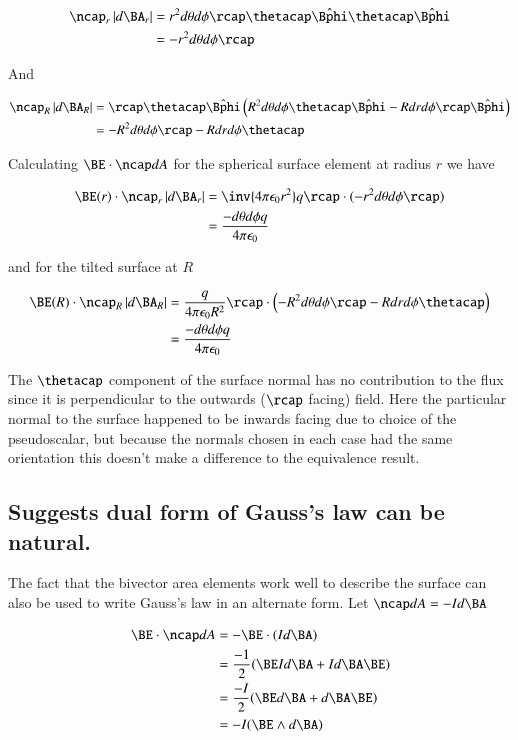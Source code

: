 \documentclass{article}
\newcommand{\phicap}[0]{\hat{\Bphi}}
\begin{document}
\begin{align*}
\ncap_r \Abs{d\BA_r}
&= r^2 d\theta d\phi \rcap \thetacap \phicap \thetacap\phicap \\
&= -r^2 d\theta d\phi \rcap \\
\end{align*}

And

\begin{align*}
\ncap_R \Abs{d\BA_R}
&= \rcap \thetacap \phicap \left( R^2 d\theta d\phi \thetacap \phicap - R dr d\phi \rcap \phicap \right) \\
&= - R^2 d\theta d\phi \rcap - R dr d\phi \thetacap
\end{align*}

Calculating $\BE \cdot \ncap dA$ for the spherical surface element at radius $r$ we have

\begin{align*}
\BE(r) \cdot \ncap_r \Abs{d\BA_r}
&= \inv{4 \pi \epsilon_0 r^2} q \rcap \cdot (-r^2 d\theta d\phi \rcap) \\
&= \frac{-d\theta d\phi q}{4 \pi \epsilon_0}
\end{align*}

and for the tilted surface at $R$ 

\begin{align*}
\BE(R) \cdot \ncap_R \Abs{d\BA_R}
&= \frac{q}{4 \pi \epsilon_0 R^2} \rcap \cdot \left(- R^2 d\theta d\phi \rcap - R dr d\phi \thetacap \right) \\
&= \frac{-d\theta d\phi q}{4 \pi \epsilon_0}
\end{align*}

The $\thetacap$ component of the surface normal has no contribution to the flux since it is perpendicular to the outwards ($\rcap$ facing) field.  Here the particular normal to the surface happened to be inwards facing due to choice of the pseudoscalar, but because the normals chosen in each case had the same orientation this doesn't make a difference to the equivalence result.

\subsection{ Suggests dual form of Gauss's law can be natural. }

The fact that the bivector area elements work well to describe the surface
can also be used to write Gauss's law in an alternate form.  Let $\ncap dA = -I d\BA$

\begin{align*}
\BE \cdot \ncap dA
&= -\BE \cdot (I d\BA) \\
&= \frac{-1}{2} ( \BE I d\BA + I d\BA \BE ) \\
&= \frac{-I}{2} ( \BE d\BA + d\BA \BE ) \\
&= -I ( \BE \wedge d\BA )
\end{align*}
\end{document}
